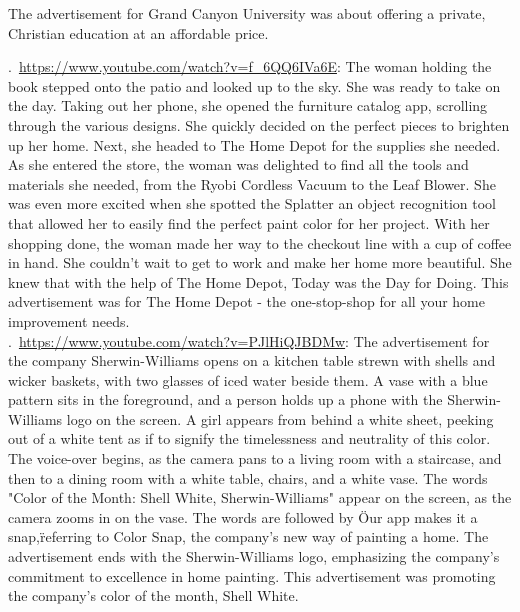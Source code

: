 \documentclass[hidelinks,11pt,a4paper]{report}
\begin{document}
    The advertisement for Grand Canyon University was about offering a private, Christian education at an affordable price.


    .~\url{https://www.youtube.com/watch?v=f_6QQ6IVa6E}: The woman holding the book stepped onto the patio and looked up to the sky. She was ready to take on the day. Taking out her phone, she opened the furniture catalog app, scrolling through the various designs. She quickly decided on the perfect pieces to brighten up her home. Next, she headed to The Home Depot for the supplies she needed. As she entered the store, the woman was delighted to find all the tools and materials she needed, from the Ryobi Cordless Vacuum to the Leaf Blower. She was even more excited when she spotted the Splatter an object recognition tool that allowed her to easily find the perfect paint color for her project. With her shopping done, the woman made her way to the checkout line with a cup of coffee in hand. She couldn't wait to get to work and make her home more beautiful. She knew that with the help of The Home Depot, Today was the Day for Doing. This advertisement was for The Home Depot - the one-stop-shop for all your home improvement needs. \\


    

    .~\url{https://www.youtube.com/watch?v=PJlHiQJBDMw}: The advertisement for the company Sherwin-Williams opens on a kitchen table strewn with shells and wicker baskets, with two glasses of iced water beside them. A vase with a blue pattern sits in the foreground, and a person holds up a phone with the Sherwin-Williams logo on the screen. A girl appears from behind a white sheet, peeking out of a white tent as if to signify the timelessness and neutrality of this color. The voice-over begins, as the camera pans to a living room with a staircase, and then to a dining room with a white table, chairs, and a white vase. The words "Color of the Month: Shell White, Sherwin-Williams" appear on the screen, as the camera zooms in on the vase. The words are followed by \"Our app makes it a snap,\" referring to Color Snap, the company's new way of painting a home. The advertisement ends with the Sherwin-Williams logo, emphasizing the company's commitment to excellence in home painting. This advertisement was promoting the company's color of the month, Shell White. \\
\end{document}
